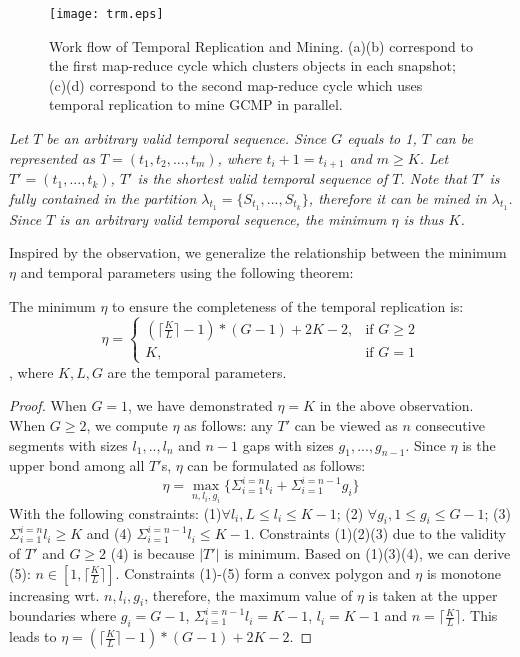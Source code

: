 \begin{figure*} [t]
\center
\texttt{[image: trm.eps]}
\caption{Work flow of Temporal Replication and Mining. (a)(b) correspond to the first map-reduce cycle which clusters objects in each snapshot;  (c)(d) correspond to the second map-reduce cycle which uses temporal replication to mine GCMP in parallel.}
\label{fig:trm}
\end{figure*}








\emph{
Let $T$ be an arbitrary valid temporal sequence. Since $G$ equals to 1,
$T$ can be represented as $T=(t_1, t_2,...,t_m)$, where
$t_i +1 = t_{i+1}$ and $m \geq K$. Let $T' = (t_1,...,t_k)$, $T'$ is the shortest
valid temporal sequence of $T$. Note that $T'$ is fully contained
in the partition $\lambda_{t_1} = \{S_{t_1},...,S_{t_k}\}$, therefore it can be
mined in $\lambda_{t_1}$. 
Since $T$ is an arbitrary valid temporal sequence, the minimum $\eta$ is thus $K$.
}

Inspired by the observation, we generalize the relationship between
the minimum $\eta$ and temporal parameters using the following theorem:

\begin{theorem}
\label{THM:RP_ETA}
The minimum $\eta$ to ensure the completeness of the temporal replication is:
\[
   \eta = 
\begin{cases}
    (\lceil \frac{K}{L} \rceil -1)*(G-1)+2K -2, & \text{if } G \geq 2\\
    K,              & \text{if } G = 1
\end{cases}
\]
, where $K,L,G$ are the temporal parameters.
\end{theorem}

\begin{proof}
When $G = 1$, we have demonstrated $\eta=K$
in the above observation. When $G \geq 2$, we compute $\eta$ as follows:
any $T'$ can be viewed as $n$ consecutive segments with sizes $l_1,..,l_n$
and $n-1$ gaps with sizes $g_1,...,g_{n-1}$.
Since $\eta$ is the upper bond among all $T'$s, $\eta$ can be formulated 
as follows:
\begin{equation}
\eta = \max_{n,l_i,g_i} \{ \Sigma_{i=1}^{i=n} l_i + \Sigma_{i=1}^{i=n-1} g_i \}
\end{equation}
With the following constraints: (1)$\forall l_i, L \leq l_i \leq K-1$; (2)
$\forall g_i, 1 \leq g_i \leq G-1 $; (3) $\Sigma_{i=1}^{i=n} l_i \geq K$ and
(4) $\Sigma_{i=1}^{i=n-1}l_i  \leq K-1$. Constraints (1)(2)(3) due to the 
validity of $T'$ and $G\geq 2$ (4) is because $|T'|$ is minimum.
Based on (1)(3)(4), we can derive (5):  $n \in [1, \lceil \frac{K}{L} \rceil]$.
Constraints (1)-(5) form a convex polygon and $\eta$ is monotone
increasing wrt. $n, l_i, g_i$, therefore, the maximum value of $\eta$ is taken at the upper boundaries
where $g_i = G-1$, 
$\Sigma_{i=1}^{i=n-1}l_i = K-1$, $l_i = K-1$
and $n = \lceil \frac{K}{L} \rceil$. This leads to  $\eta = (\lceil \frac{K}{L} \rceil -1)*(G-1)+2K -2$.
\end{proof}

